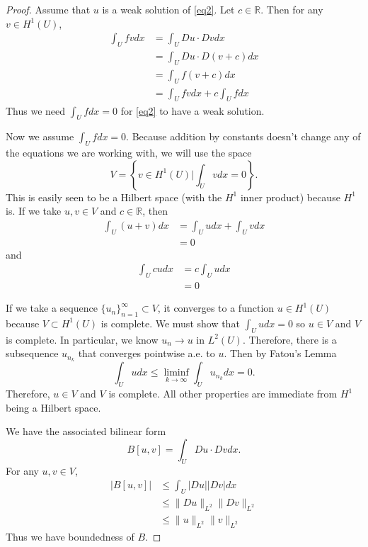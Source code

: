 \documentclass[a4paper]{article}
\newcommand{\R}{\mathbb{R}}
\begin{document}
\begin{enumerate}
    \begin{proof}
      Assume that $u$ is a weak solution of \eqref{eq2}. Let $c \in \R$. Then for any $v \in H^1(U)$,
      \begin{align*}
	\int_{U}^{} fv dx &= \int_{U}^{} Du \cdot Dv dx \\
	&= \int_{U}^{} Du \cdot D(v+c) dx \\
	&= \int_{U}^{} f (v+c) dx \\
	&= \int_{U}^{} fv dx + c \int_{U}^{} f dx
      \end{align*}
      Thus we need $\int_{U}^{} f dx = 0$ for \eqref{eq2} to have a weak solution.

      Now we assume $\int_{U}^{} f dx = 0$. Because addition by constants doesn't change any of the equations we are working with, we will use the space
      \[ V = \left\{ v \in H^1(U) | \int_{U}^{} v dx = 0 \right\} .\]
      This is easily seen to be a Hilbert space (with the $H^1$ inner product) because $H^1$ is. If we take $u,v \in V$ and $c \in \R$, then
      \begin{align*}
	\int_{U}^{} (u+v) dx &= \int_{U}^{} u dx + \int_{U}^{} v dx \\
	&= 0
      \end{align*}
      and
      \begin{align*}
	\int_{U}^{} c u dx &= c \int_{U}^{} u dx \\
	&= 0
      \end{align*}

      If we take a sequence $\{ u_n \}_{n=1}^\infty \subset V$, it converges to a function $u \in H^1(U)$ because $V \subset H^1(U)$ is complete. We must show that $\int_{U}^{} u dx = 0$ so $u \in V$ and $V$ is complete.
      In particular, we know  $u_n \to u$ in $L^2(U)$. Therefore, there is a subsequence $u_{n_k}$ that converges pointwise a.e. to $u$. Then by Fatou's Lemma
      \[ \int_{U}^{} u dx \leq \liminf_{k \to \infty} \int_{U}^{} u_{n_k} dx = 0 .\]
      Therefore, $u \in V$ and $V$ is complete.
      All other properties are immediate from $H^1$ being a Hilbert space.

      We have the associated bilinear form
      \[ B[u,v] = \int_{U}^{} Du \cdot Dv dx .\]
      For any $u,v \in V$,
      \begin{align*}
	| B[u,v] | &\leq \int_{U}^{} |Du| |Dv| dx \\
	&\leq \|Du\|_{L^2} \|Dv\|_{L^2} \\
	&\leq \|u\|_{L^2} \|v\|_{L^2}
      \end{align*}
      Thus we have boundedness of $B$.


\end{proof}
\end{enumerate}
\end{document}
